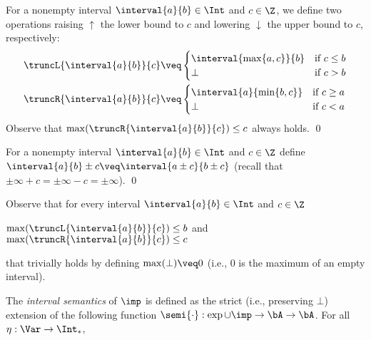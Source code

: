 \begin{definition}
  \label{de:trunc}
  For a nonempty interval \(\interval{a}{b} \in \Int\) and \(c \in \Z\), we define
  two operations raising \(\uparrow\) the lower bound to \(c\) and lowering \(\downarrow\) the upper
  bound to \(c\), respectively:
  \begin{align*}
    &\truncL{\interval{a}{b}}{c} \veq 
      \begin{cases} 
        \interval{\max\{a,c\}}{b} & \text{if } c\leq b\\
        \bot & \text{if } c > b
      \end{cases}
    \\
    &\truncR{\interval{a}{b}}{c} \veq 
      \begin{cases}   
        \interval{a}{\min\{b,c\}} & \text{if } c\geq a\\
        \bot & \text{if } c < a 
      \end{cases} 
  \end{align*}
  Observe that \(\max(\truncR{\interval{a}{b}}{c})\leq c\) always holds. \qed   
\end{definition}

\begin{definition}
  \label{de:add}
  For a nonempty interval \(\interval{a}{b} \in \Int\) and \(c \in \Z\) define
  \(\interval{a}{b} \pm c \veq \interval{a\pm c}{b\pm c}\) (recall that \(\pm \infty + c = \pm\infty - c = \pm\infty\)).  
  \qed
\end{definition}


Observe that for every interval \(\interval{a}{b} \in \Int\) and
\(c \in \Z\)
\begin{center}
  \(\max(\truncL{\interval{a}{b}}{c}) \leq b\)
  \qquad and \qquad
  \(\max(\truncR{\interval{a}{b}}{c}) \leq c\)
\end{center}
that trivially holds by 
defining \(\max (\bot)  \veq 0\) (i.e., \(0\) is the maximum of
an empty interval).

The \emph{interval semantics} of \(\imp\) is defined as the strict
(i.e., preserving \(\bot\))
extension of the following function \(\semi{\cdot}: \exp \cup \imp \to
\bA \to \bA\). For all \(\eta: \Var \to \Int_*\),

